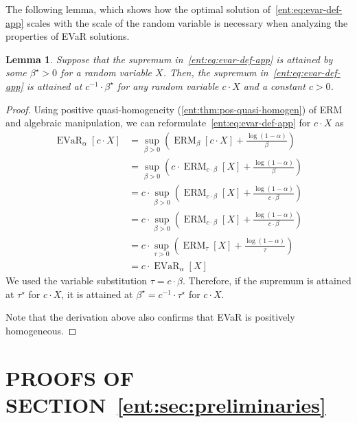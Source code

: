 \documentclass[twoside]{article}
\newcommand{\opt}{^\star}
\newcommand{\erm}[2]{\operatorname{ERM}_{#1}\left[#2\right]}
\newcommand{\evar}[2]{\operatorname{EVaR}_{#1} \left[#2\right]}
\theoremstyle{plain}
\newtheorem{lemma}[theorem]{Lemma}
\theoremstyle{definition}
\theoremstyle{remark}
\begin{document}
The following lemma, which shows how the optimal solution of~\eqref{ent:eq:evar-def-app} scales with the scale of the random variable is necessary when analyzing the properties of EVaR solutions.
\begin{lemma} \label{ent:lem:evar-opt-scaling}
Suppose that the supremum in~\eqref{ent:eq:evar-def-app} is attained by some $\beta\opt > 0$ for a random variable $X$. Then, the supremum in~\eqref{ent:eq:evar-def-app} is attained  at $c^{-1}\cdot \beta\opt$ for any random variable $c\cdot X$ and a constant $c > 0$. 
\end{lemma}
\begin{proof}
Using positive quasi-homogeneity (\cref{ent:thm:pos-quasi-homogen}) of ERM and algebraic manipulation, we can reformulate~\eqref{ent:eq:evar-def-app} for $c\cdot X$ as
  \begin{align*}
    \evar{\alpha}{c\cdot X}
    &= \sup_{\beta>0}\left(\erm{\beta}{c\cdot X} + \frac{\log(1 - \alpha)}{\beta}\right) \\
    &= \sup_{\beta>0}\left(c \cdot \erm{c\cdot\beta}{X} + \frac{\log(1 - \alpha)}{\beta}\right) \\
    &= c \cdot \sup_{\beta>0}\left(\erm{c\cdot\beta}{X} + \frac{\log(1 - \alpha)}{c\cdot \beta}\right) \\
    &= c \cdot \sup_{\beta>0}\left(\erm{c\cdot\beta}{X} + \frac{\log(1 - \alpha)}{c\cdot \beta}\right) \\
    &= c \cdot \sup_{\tau>0}\left(\erm{\tau}{X} + \frac{\log(1 - \alpha)}{\tau}\right) \\
    &= c\cdot \evar{\alpha}{X}
  \end{align*}
We used the variable substitution $\tau = c\cdot \beta$. Therefore, if the supremum is attained at $\tau\opt $ for $c\cdot X$, it is attained at $\beta\opt = c^{-1} \cdot \tau\opt$ for $c\cdot X$.

Note that the derivation above also confirms that EVaR is positively homogeneous. 
\end{proof}


\newpage
\section{PROOFS OF SECTION~\ref{ent:sec:preliminaries}}
\label{ent:app:sec:prelim} 
\end{document}
